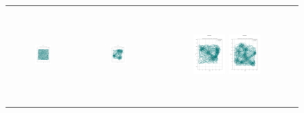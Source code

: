 \begin{figure}[p]
\begin{tabular}{ccc}
        \includegraphics[height=36mm,width=0.24\textwidth]{Images/simulation_no_obs/dubins_path/21.png}
        & \includegraphics[height=36mm,width=0.24\textwidth]{Images/simulation_no_obs/dubins_path/22.png}
        & \includegraphics[height=36mm,width=0.24\textwidth]{Images/simulation_no_obs/dubins_path/23.png}
         \includegraphics[height=36mm,width=0.24\textwidth]{Images/simulation_no_obs/dubins_path/24.png}\\[-4pt]


\end{tabular}
\end{figure}
